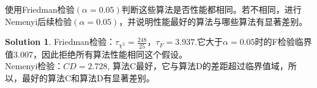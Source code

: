 \documentclass[a4paper,UTF8]{article}
\theoremstyle{definition}
\newtheorem*{solution}{Solution}
\begin{document}
使用Friedman检验$(\alpha=0.05)$判断这些算法是否性能都相同。若不相同，进行Nemenyi后续检验$(\alpha=0.05)$，并说明性能最好的算法与哪些算法有显著差别。
\begin{solution}
Friedman检验：$\tau_{\chi^2}=\frac{248}{25}$，$\tau_F=3.937$.它大于$\alpha=0.05$时的F检验临界值3.007，因此拒绝所有算法性能相同这个假设。\\
Nemenyi检验：$CD=2.728$, 算法C最好，它与算法D的差距超过临界值域，所以，最好的算法C和算法D有显著差别。

\end{solution}
\end{document}
